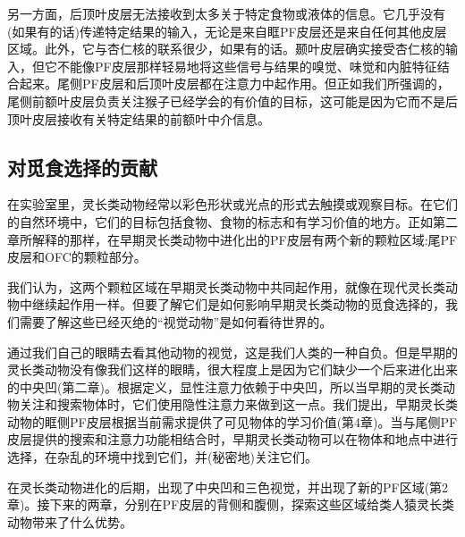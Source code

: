 另一方面，后顶叶皮层无法接收到太多关于特定食物或液体的信息。它几乎没有(如果有的话)传递特定结果的输入，无论是来自眶PF皮层还是来自任何其他皮层区域。此外，它与杏仁核的联系很少，如果有的话。颞叶皮层确实接受杏仁核的输入，但它不能像PF皮层那样轻易地将这些信号与结果的嗅觉、味觉和内脏特征结合起来。尾侧PF皮层和后顶叶皮层都在注意力中起作用。但正如我们所强调的，尾侧前额叶皮层负责关注猴子已经学会的有价值的目标，这可能是因为它而不是后顶叶皮层接收有关特定结果的前额叶中介信息。
\subsection{对觅食选择的贡献}
在实验室里，灵长类动物经常以彩色形状或光点的形式去触摸或观察目标。在它们的自然环境中，它们的目标包括食物、食物的标志和有学习价值的地方。正如第二章所解释的那样，在早期灵长类动物中进化出的PF皮层有两个新的颗粒区域:尾PF皮层和OFC的颗粒部分。

我们认为，这两个颗粒区域在早期灵长类动物中共同起作用，就像在现代灵长类动物中继续起作用一样。但要了解它们是如何影响早期灵长类动物的觅食选择的，我们需要了解这些已经灭绝的“视觉动物”是如何看待世界的。

通过我们自己的眼睛去看其他动物的视觉，这是我们人类的一种自负。但是早期的灵长类动物没有像我们这样的眼睛，很大程度上是因为它们缺少一个后来进化出来的中央凹(第二章)。根据定义，显性注意力依赖于中央凹，所以当早期的灵长类动物关注和搜索物体时，它们使用隐性注意力来做到这一点。我们提出，早期灵长类动物的眶侧PF皮层根据当前需求提供了可见物体的学习价值(第4章)。当与尾侧PF皮层提供的搜索和注意力功能相结合时，早期灵长类动物可以在物体和地点中进行选择，在杂乱的环境中找到它们，并(秘密地)关注它们。

在灵长类动物进化的后期，出现了中央凹和三色视觉，并出现了新的PF区域(第2章)。接下来的两章，分别在PF皮层的背侧和腹侧，探索这些区域给类人猿灵长类动物带来了什么优势。